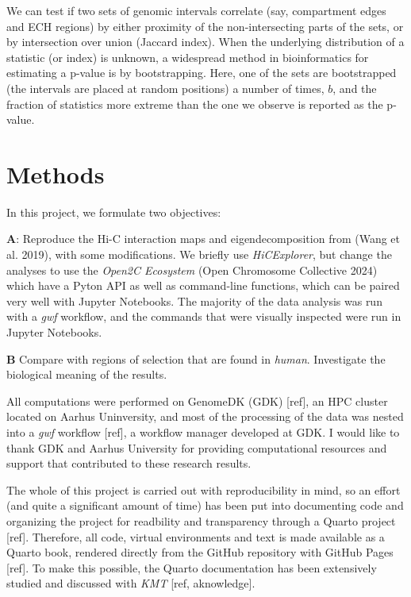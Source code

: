 \documentclass[
  11pt,
  a4paper,
]{scrbook}
\let\oldemph\emph
\renewcommand\emph[1]{\oldemph{\color{gray}#1}}
\begin{document}
We can test if two sets of genomic intervals correlate (say, compartment
edges and ECH regions) by either proximity of the non-intersecting parts
of the sets, or by intersection over union (Jaccard index). When the
underlying distribution of a statistic (or index) is unknown, a
widespread method in bioinformatics for estimating a p-value is by
bootstrapping. Here, one of the sets are bootstrapped (the intervals are
placed at random positions) a number of times, \(b\), and the fraction
of statistics more extreme than the one we observe is reported as the
p-value.

\chapter{Methods}\label{methods}

In this project, we formulate two objectives:

\textbf{A}: Reproduce the Hi-C interaction maps and eigendecomposition
from (Wang et al. 2019), with some modifications. We briefly use
\emph{HiCExplorer}, but change the analyses to use the \emph{Open2C
Ecosystem} (Open Chromosome Collective 2024) which have a Pyton API as
well as command-line functions, which can be paired very well with
Jupyter Notebooks. The majority of the data analysis was run with a
\emph{gwf} workflow, and the commands that were visually inspected were
run in Jupyter Notebooks.

\textbf{B} Compare with regions of selection that are found in
\emph{human}. Investigate the biological meaning of the results.

All computations were performed on GenomeDK (GDK) {[}ref{]}, an HPC
cluster located on Aarhus Uninversity, and most of the processing of the
data was nested into a \emph{gwf} workflow {[}ref{]}, a workflow manager
developed at GDK. I would like to thank GDK and Aarhus University for
providing computational resources and support that contributed to these
research results.

The whole of this project is carried out with reproducibility in mind,
so an effort (and quite a significant amount of time) has been put into
documenting code and organizing the project for readbility and
transparency through a Quarto project {[}ref{]}. Therefore, all code,
virtual environments and text is made available as a Quarto book,
rendered directly from the GitHub repository with GitHub Pages
{[}ref{]}. To make this possible, the Quarto documentation has been
extensively studied and discussed with \emph{KMT} {[}ref, aknowledge{]}.
\end{document}
